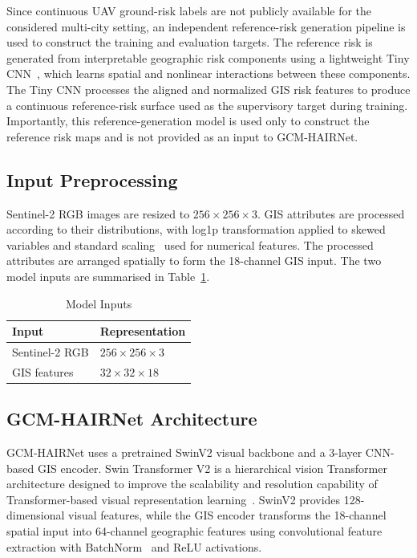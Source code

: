 \documentclass[sigconf, review=true]{acmart}
\begin{document}
Since continuous UAV ground-risk labels are not publicly available for the considered multi-city setting, an independent reference-risk generation pipeline is used to construct the training and evaluation targets. The reference risk is generated from interpretable geographic risk components using a lightweight Tiny CNN~\cite{tinycnn2024}, which learns spatial and nonlinear interactions between these components. The Tiny CNN processes the aligned and normalized GIS risk features to produce a continuous reference-risk surface used as the supervisory target during training. Importantly, this reference-generation model is used only to construct the reference risk maps and is not provided as an input to GCM-HAIRNet.

\subsection{Input Preprocessing}

Sentinel-2 RGB images are resized to $256\times256\times3$. GIS attributes are processed according to their distributions, with log1p transformation applied to skewed variables and standard scaling~\cite{long1992logtransform,kotsiantis2006preprocessing} used for numerical features. The processed attributes are arranged spatially to form the 18-channel GIS input. The two model inputs are summarised in Table~\ref{tab:inputs}.

\begin{table}[t]
  \caption{Model Inputs}
  \label{tab:inputs}
  \begin{tabular}{ll}
    \toprule
    \textbf{Input} & \textbf{Representation} \\
    \midrule
    Sentinel-2 RGB & $256\times256\times3$ \\
    GIS features   & $32\times32\times18$ \\
    \bottomrule
  \end{tabular}
\end{table}

\subsection{GCM-HAIRNet Architecture}

GCM-HAIRNet uses a pretrained SwinV2 visual backbone and a 3-layer CNN-based GIS encoder. Swin Transformer V2 is a hierarchical vision Transformer architecture designed to improve the scalability and resolution capability of Transformer-based visual representation learning~\cite{liu2022swinv2}. SwinV2 provides 128-dimensional visual features, while the GIS encoder transforms the 18-channel spatial input into 64-channel geographic features using convolutional feature extraction with BatchNorm~\cite{ioffe2015batchnorm} and ReLU activations.
\end{document}

